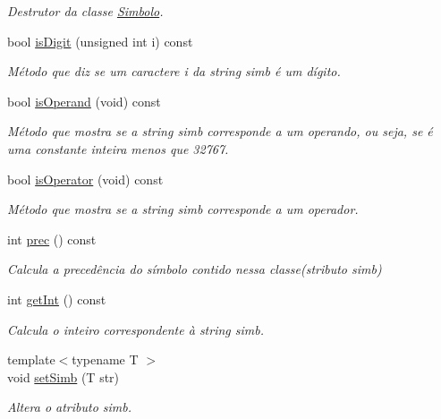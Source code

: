 \begin{DoxyCompactItemize}
\begin{DoxyCompactList}\small\item\em Destrutor da classe \hyperlink{class_simbolo}{Simbolo}. \end{DoxyCompactList}\item 
bool \hyperlink{class_simbolo_a8962891d225bab0bc303ae18479e1819}{is\-Digit} (unsigned int i) const 
\begin{DoxyCompactList}\small\item\em Método que diz se um caractere i da string simb é um dígito. \end{DoxyCompactList}\item 
bool \hyperlink{class_simbolo_a9279c6324f734268c1b791f48a23c11e}{is\-Operand} (void) const 
\begin{DoxyCompactList}\small\item\em Método que mostra se a string simb corresponde a um operando, ou seja, se é uma constante inteira menos que 32767. \end{DoxyCompactList}\item 
bool \hyperlink{class_simbolo_a6a8ad5148ec3fc647db2a6908b541ae3}{is\-Operator} (void) const 
\begin{DoxyCompactList}\small\item\em Método que mostra se a string simb corresponde a um operador. \end{DoxyCompactList}\item 
int \hyperlink{class_simbolo_a3b871fb6dfe874c43b9efea39d24c419}{prec} () const 
\begin{DoxyCompactList}\small\item\em Calcula a precedência do símbolo contido nessa classe(stributo simb) \end{DoxyCompactList}\item 
int \hyperlink{class_simbolo_a0e0c1733cc694a9f9e53d8935d308601}{get\-Int} () const 
\begin{DoxyCompactList}\small\item\em Calcula o inteiro correspondente à string simb. \end{DoxyCompactList}\item 
{\footnotesize template$<$typename T $>$ }\\void \hyperlink{class_simbolo_a8834f282dd88bf905a9f008676f874eb}{set\-Simb} (T str)
\begin{DoxyCompactList}\small\item\em Altera o atributo simb. \end{DoxyCompactList}\item 

\end{DoxyCompactItemize}
